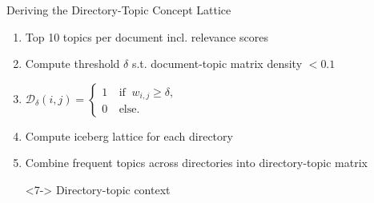 \begin{frame}{Deriving the Directory-Topic Concept Lattice}
    \begin{enumerate}
        \item <2-> Top 10 topics per document incl. relevance scores
        \item <3-> Compute threshold $\delta$ s.t. document-topic matrix density $< 0.1$
        \item <4-> $\mathcal{D}_\delta(i,j)=\left\{ \begin{array}{cl}
                        1 & \ \text{if } \ w_{i,j} \geq \delta, \\
                        0 & \ \text{else.}
                    \end{array} \right.$
        \item <5-> Compute iceberg lattice for each directory
        \item <6-> Combine frequent topics across directories into directory-topic matrix
        \item[\rightarrowfill] <7-> Directory-topic context
    \end{enumerate}






\end{frame}
